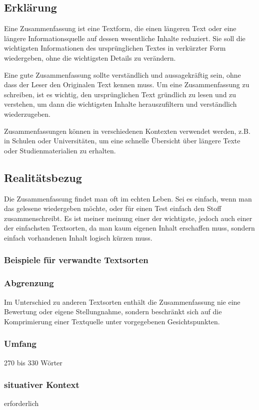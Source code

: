 \subsection{Erklärung}

Eine Zusammenfassung ist eine Textform, die einen längeren Text oder eine längere Informationsquelle auf dessen wesentliche Inhalte reduziert. Sie soll die wichtigsten Informationen des ursprünglichen Textes in verkürzter Form wiedergeben, ohne die wichtigsten Details zu verändern.

Eine gute Zusammenfassung sollte verständlich und aussagekräftig sein, ohne dass der Leser den Originalen Text kennen muss. Um eine Zusammenfassung zu schreiben, ist es wichtig, den ursprünglichen Text gründlich zu lesen und zu verstehen, um dann die wichtigsten Inhalte herauszufiltern und verständlich wiederzugeben.

Zusammenfassungen können in verschiedenen Kontexten verwendet werden, z.B. in Schulen oder Universitäten, um eine schnelle Übersicht über längere Texte oder Studienmaterialien zu erhalten.
\subsection{Realitätsbezug}
Die Zusammenfassung findet man oft im echten Leben. Sei es einfach, wenn man das gelesene wiedergeben möchte, oder für einen Test einfach den Stoff zusammenschreibt. Es ist meiner meinung einer der wichtigste, jedoch auch einer der einfachsten Textsorten, da man kaum eigenen Inhalt erschaffen muss, sondern einfach vorhandenen Inhalt logisch kürzen muss. 

\subsubsection{Beispiele für verwandte Textsorten}
\subsubsection{Abgrenzung} Im Unterschied zu anderen Textsorten enthält die Zusammenfassung
nie eine Bewertung oder eigene Stellungnahme, sondern beschränkt
sich auf die Komprimierung einer Textquelle unter vorgegebenen
Gesichtspunkten.
\subsubsection{Umfang} 270 bis 330 Wörter
\subsubsection{situativer Kontext} erforderlich


